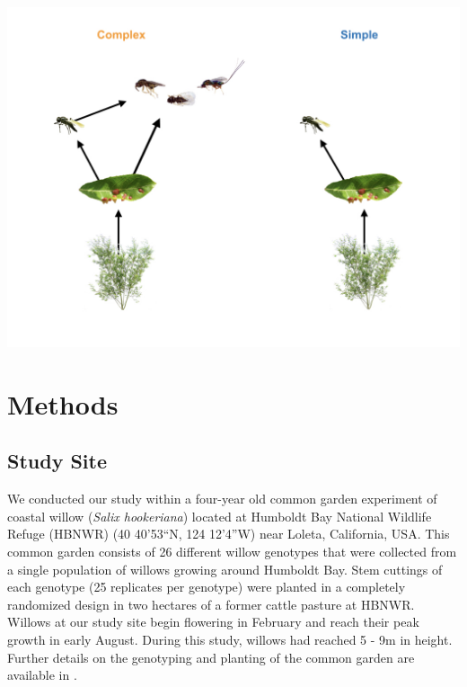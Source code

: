 \documentclass[11pt,]{article}
\let\origfigure\figure
\let\endorigfigure\endfigure
\renewenvironment{figure}[1][2] {
    \expandafter\origfigure\expandafter[H]
} {
    \endorigfigure
}
\begin{document}
\begin{figure}
\centering
\includegraphics{analyses/complex_simple_foodwebs_v2.jpeg}
\caption{\label{fig:Conceptual}Experimental manipulation of food-web
structure associated with a leaf-galling midge (\emph{Iteomyia
salicisverruca}) feeding on the willow \emph{Salix hookeriana}. Black
arrows denote the flow of energy in this network of trophic
interactions. In the original food web, we allowed the full suite of egg
and larval parasitoids to impose selection. To simulate consumer
extinction, we used mesh bags to exclude the guild of larval
parasitoids, only allowing the egg parasitoid (\emph{Platygaster} sp.)
to impose selection. Larval parasitoids include the following species
(from left to right): \emph{Mesopolobus} sp. (Family: Pteromalidae);
\emph{Tetrastichus} sp. (Family: Eulophidae); and \emph{Torymus} sp.
(Family: Torymidae).}
\end{figure}

\section{Methods}\label{methods}

\subsection{Study Site}\label{study-site}

We conducted our study within a four-year old common garden experiment
of coastal willow (\emph{Salix hookeriana}) located at Humboldt Bay
National Wildlife Refuge (HBNWR) (40 40'53``N, 124 12'4''W) near Loleta,
California, USA. This common garden consists of 26 different willow
genotypes that were collected from a single population of willows
growing around Humboldt Bay. Stem cuttings of each genotype (25
replicates per genotype) were planted in a completely randomized design
in two hectares of a former cattle pasture at HBNWR. Willows at our
study site begin flowering in February and reach their peak growth in
early August. During this study, willows had reached 5 - 9m in height.
Further details on the genotyping and planting of the common garden are
available in \citet{Barbour2015}.
\end{document}

